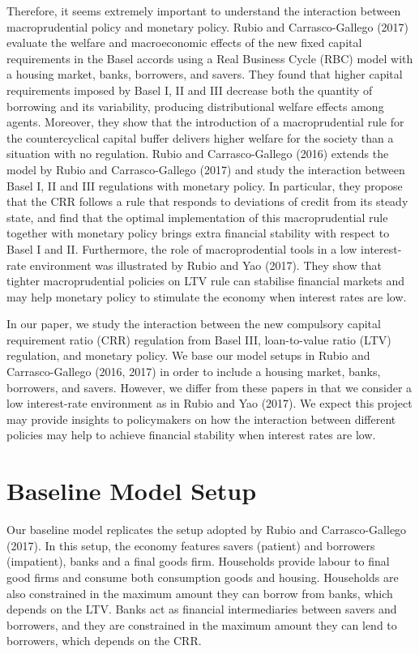 \documentclass[final,3p,times,twocolumn]{elsarticle}
\begin{document}
Therefore, it seems extremely important to understand the interaction between macroprudential policy and monetary policy. Rubio and Carrasco-Gallego (2017) evaluate the welfare and macroeconomic effects of the new fixed capital requirements in the Basel accords using a Real Business Cycle (RBC) model with a housing market, banks, borrowers, and savers. They found that higher capital requirements imposed by Basel I, II and III decrease both the quantity of borrowing and its variability, producing distributional welfare effects among agents. Moreover, they show that the introduction of a macroprudential rule for the countercyclical capital buffer delivers higher welfare for the society than a situation with no regulation. Rubio and Carrasco-Gallego (2016) extends the model by Rubio and Carrasco-Gallego (2017) and study the interaction between Basel I, II and III regulations with monetary policy. In particular, they propose that the CRR follows a rule that responds to deviations of credit from its steady state, and find that the optimal implementation of this macroprudential rule together with monetary policy brings extra financial stability with respect to Basel I and II. Furthermore, the role of macroprodential tools in a low interest-rate environment was illustrated by Rubio and Yao (2017). They show that tighter macroprudential policies on LTV rule can stabilise financial markets and may help monetary policy to stimulate the economy when interest rates are low.\par

In our paper, we study the interaction between the new compulsory capital requirement ratio (CRR) regulation from Basel III, loan-to-value ratio (LTV) regulation, and monetary policy. We base our model setups in Rubio and Carrasco-Gallego (2016, 2017) in order to include a housing market, banks, borrowers, and savers. However, we differ from these papers in that we consider a low interest-rate environment as in Rubio and Yao (2017). We expect this project may provide insights to policymakers on how the interaction between different policies may help to achieve financial stability when interest rates are low.\par


\section{Baseline Model Setup}

Our baseline model replicates the setup adopted by Rubio and Carrasco-Gallego (2017). In this setup, the economy features savers (patient) and borrowers (impatient), banks and a final goods firm. Households provide labour to final good firms and consume both consumption goods and housing. Households are also constrained in the maximum amount they can borrow from banks, which depends on the LTV. Banks act as financial intermediaries between savers and borrowers, and they are constrained in the maximum amount they can lend to borrowers, which depends on the CRR.
\end{document}
